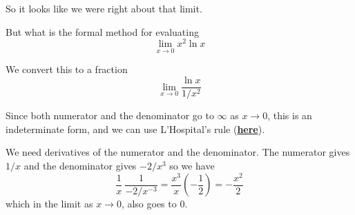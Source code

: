 \documentclass[11pt, oneside]{article}
\begin{document}
So it looks like we were right about that limit.

But what is the formal method for evaluating
\[  \lim_{x \rightarrow 0} x^2 \ln x \]

We convert this to a fraction
\[  \lim_{x \rightarrow 0} \frac{\ln x}{1/x^{2}} \]

Since both numerator and the denominator go to $\infty$ as $x \rightarrow 0$, this is an indeterminate form, and we can use L'Hospital's rule (\hyperref[sec:Hospital]{\textbf{here}}).

We need derivatives of the numerator and the denominator.  The numerator gives $1/x$ and the denominator gives $-2/x^{3}$ so we have
\[ \frac{1}{x} \ \frac{1}{-2/x^{-3}} = \frac{x^3}{x}(- \frac{1}{2}) = - \frac{x^2}{2} \]
which in the limit as $x \rightarrow 0$, also goes to $0$.
\end{document}
